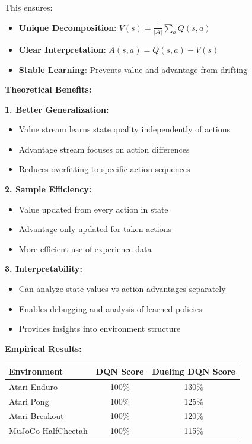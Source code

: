 \documentclass[12pt]{article}
\begin{document}
{{This ensures:
\begin{itemize}
\item \textbf{Unique Decomposition}: $V(s) = \frac{1}{|\mathcal{A}|}\sum_a Q(s,a)$
\item \textbf{Clear Interpretation}: $A(s,a) = Q(s,a) - V(s)$
\item \textbf{Stable Learning}: Prevents value and advantage from drifting
\end{itemize}

\textbf{Theoretical Benefits:}

\textbf{1. Better Generalization:}
\begin{itemize}
\item Value stream learns state quality independently of actions
\item Advantage stream focuses on action differences
\item Reduces overfitting to specific action sequences
\end{itemize}

\textbf{2. Sample Efficiency:}
\begin{itemize}
\item Value updated from every action in state
\item Advantage only updated for taken actions
\item More efficient use of experience data
\end{itemize}

\textbf{3. Interpretability:}
\begin{itemize}
\item Can analyze state values vs action advantages separately
\item Enables debugging and analysis of learned policies
\item Provides insights into environment structure
\end{itemize}

\textbf{Empirical Results:}

\begin{center}
\begin{tabular}{|l|c|c|}
\hline
\textbf{Environment} & \textbf{DQN Score} & \textbf{Dueling DQN Score} \\
\hline
Atari Enduro & 100\% & 130\% \\
Atari Pong & 100\% & 125\% \\
Atari Breakout & 100\% & 120\% \\
MuJoCo HalfCheetah & 100\% & 115\% \\
\hline
\end{tabular}
\end{center}

}}
\end{document}
